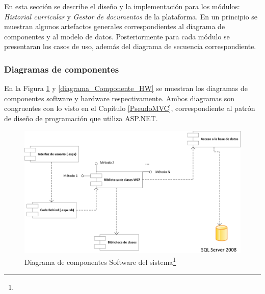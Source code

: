 	En esta sección se describe el diseño y la implementación para los módulos: \textit{Historial curricular} y \textit{Gestor de documentos} de la plataforma. En un principio se muestran algunos artefactos generales correspondientes al diagrama de componentes y al modelo de datos. Posteriormente para cada módulo se presentaran los casos de uso, además del diagrama de secuencia correspondiente.


	\subsubsection{Diagramas de componentes}
	
	En la Figura \ref{diagrama_Componente_SW} y \ref{diagrama_Componente_HW} se muestran los diagramas de componentes software y hardware respectivamente. Ambos diagramas son congruentes con lo visto en el Capítulo \ref{PseudoMVC}, correspondiente al patrón de diseño de programación que utiliza ASP.NET.
			\begin{figure}[H]
				\centering
				\includegraphics[width=1\textwidth]{images/Capitulo_3/Componente_SW.png}
				\caption[Diagrama de componentes Software del sistema]{Diagrama de componentes Software del sistema\footnote{}}
				\label{diagrama_Componente_SW}
			\end{figure}
